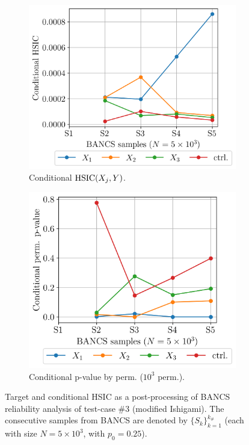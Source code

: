 \begin{figure}
    \\[20pt]
    \begin{subfigure}[b]{0.48\linewidth}
        \centering
        \includegraphics[width=\linewidth]{part3/figures/BANCS/ishigami_CHSIC.png}
        \caption{Conditional $\mathrm{HSIC}(X_j, Y)$.}
    \end{subfigure}
    \begin{subfigure}[b]{0.48\linewidth}
        \centering
        \includegraphics[width=\linewidth]{part3/figures/BANCS/ishigami_Cpvalue_permutation.png}
        \caption{Conditional p-value by perm. ($10^3$ perm.).}
    \end{subfigure}
    \caption{Target and conditional HSIC as a post-processing of BANCS reliability analysis of test-case \#3 (modified Ishigami). 
                The consecutive samples from BANCS are denoted by $\{S_k\}_{k=1}^{k_\#}$ (each with size $N=5\times10^3$, with $p_0=0.25$).}
    \label{fig:rosa_ishigami}
\end{figure}


